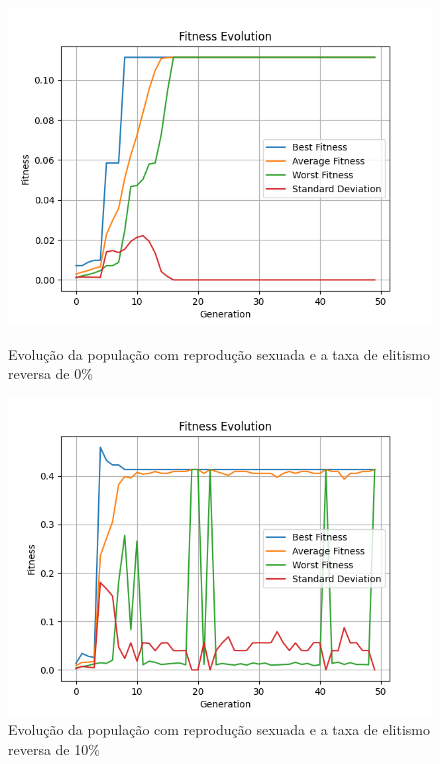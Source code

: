 \documentclass[12pt]{article}
\begin{document}
\begin{figure}[h]
    \centering
    \begin{minipage}{0.5\textwidth}
        \centering
        \includegraphics[width=\linewidth]{figures/sexuado/rev_ev_0.png}
        \caption{Evolução da população com reprodução sexuada e a taxa de elitismo reversa de 0\%}
        \label{fig:reverse_elitism_sex_0}
    \end{minipage}\hfill
    \begin{minipage}{0.5\textwidth}
        \centering
        \includegraphics[width=\linewidth]{figures/sexuado/rev_el_10.png}
        \caption{Evolução da população com reprodução sexuada e a taxa de elitismo reversa de 10\%}
        \label{fig:reverse_elitism_sex_10}
    \end{minipage}
\end{figure}
\end{document}
